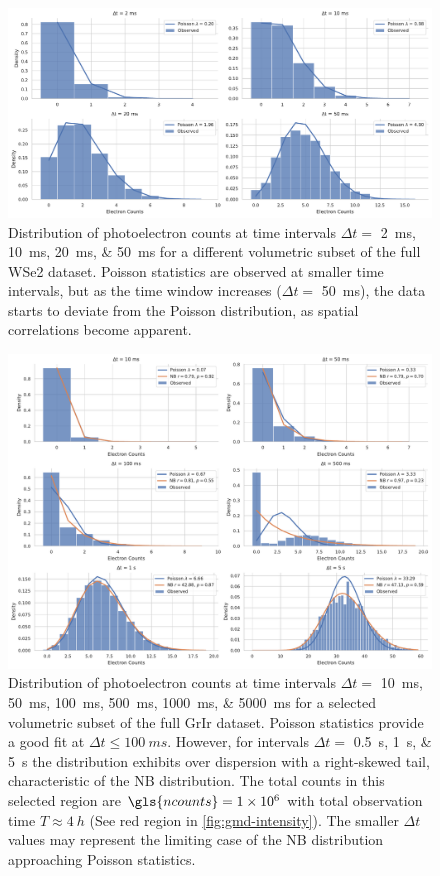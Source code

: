 \begin{figure}
    \centering
    \includegraphics[width=1\linewidth]{images/hist_counts_facetgrid_2_wse2.pdf}
    \caption{Distribution of photoelectron counts at time intervals $\Delta t =$ \qtylist{2;10;20;50}{ms} for a different volumetric subset of the full \gls{WSe2} dataset. Poisson statistics are observed at smaller time intervals, but as the time window increases ($\Delta t =$ \qty{50}{ms}), the data starts to deviate from the Poisson distribution, as spatial correlations become apparent.}
    \label{fig:wse2-stats-2}
\end{figure}

\begin{figure}
    \centering
    \includegraphics[width=1\linewidth]{images/hist_counts_facetgrid_3_grir.pdf}
    \caption{Distribution of photoelectron counts at time intervals $\Delta t =$ \qtylist{10;50;100;500;1000;5000}{ms} for a selected volumetric subset of the full \gls{GrIr} dataset. Poisson statistics provide a good fit at $\Delta t \leq \qty{100}{ms}$. However, for intervals $\Delta t =$ \qtylist{0.5;1;5}{s} the distribution exhibits over dispersion with a right-skewed tail, characteristic of the \gls{NB} distribution. The total counts in this selected region are $\gls{ncounts}=\num{1e6}$ with total observation time $T\approx\qty{4}{h}$  (See red region in \cref{fig:gmd-intensity}). The smaller $\Delta t$ values may represent the limiting case of the \gls{NB} distribution approaching Poisson statistics.}
    \label{fig:grir-stats-3}
\end{figure}



